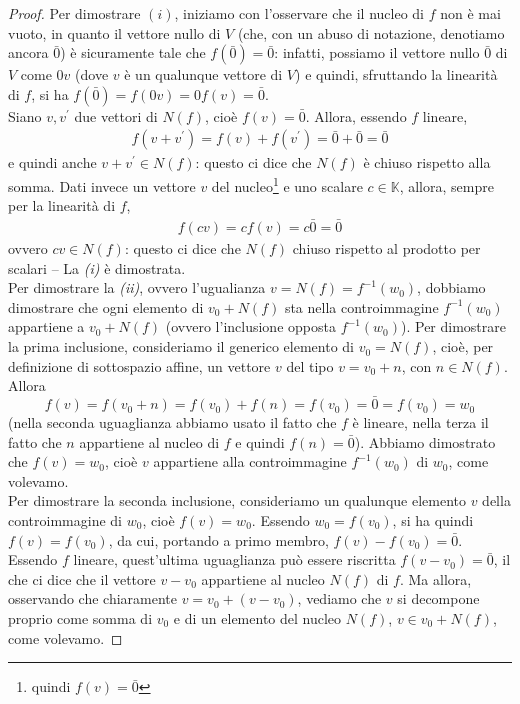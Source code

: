 \documentclass{book}
\begin{document}
\begin{proof}
  Per dimostrare $(i)$, iniziamo con l'osservare che il nucleo di $f$ non è mai vuoto, in quanto il vettore
  nullo di $V$ (che, con un abuso di notazione, denotiamo ancora $\bar{0}$) è sicuramente tale che
  $f(\bar{0})=\bar{0}$: infatti, possiamo il vettore nullo $\bar{0}$ di $V$ come $0v$ (dove $v$ è un qualunque
  vettore di $V$) e quindi, sfruttando la linearità di $f$, si ha $f(\bar{0})=f(0v)=0f(v)=\bar{0}$.\\
  Siano $v,v^\prime$ due vettori di $N(f)$, cioè $f(v)=\bar{0}$. Allora, essendo $f$ lineare,
  \begin{eqnarray*}
    f(v+v^\prime)=f(v)+f(v^\prime)=\bar{0}+\bar{0}=\bar{0}
  \end{eqnarray*}
  e quindi anche $v+v^\prime\in N(f)$: questo ci dice che $N(f)$ è chiuso rispetto alla somma.
  Dati invece un vettore $v$ del nucleo\footnote{quindi $f(v)=\bar{0}$} e uno scalare $c\in
  \mathds{K}$, allora, sempre per la linearità di $f$,
  \begin{eqnarray*}
    f(cv)=cf(v)=c\bar{0}=\bar{0}
  \end{eqnarray*}
  ovvero $cv\in N(f)$: questo ci dice che $N(f)$ chiuso rispetto al prodotto per scalari -- La
  \textit{(i)} è dimostrata.\\
  Per dimostrare la \textit{(ii)}, ovvero l'ugualianza $v=N(f)=f^{-1}(w_0)$, dobbiamo dimostrare
  che ogni elemento di $v_0+N(f)$ sta nella controimmagine $f^{-1}(w_0)$ appartiene a $v_0+N(f)$
  (ovvero l'inclusione opposta $f^{-1}(w_0)$). Per dimostrare la prima inclusione, consideriamo il
  generico elemento di $v_0=N(f)$, cioè, per definizione di sottospazio affine, un vettore $v$ del
  tipo $v=v_0+n$, con $n\in N(f)$. Allora
  \begin{equation*}
    f(v)=f(v_0+n)=f(v_0)+f(n)=f(v_0)=\bar{0}=f(v_0)=w_0
  \end{equation*}
  (nella seconda uguaglianza abbiamo usato il fatto che $f$ è lineare, nella terza il fatto che $n$ appartiene
  al nucleo di $f$ e quindi $f(n)=\bar{0}$). Abbiamo dimostrato che $f(v)=w_0$, cioè $v$ appartiene alla
  controimmagine $f^{-1}(w_0)$ di $w_0$, come volevamo.\\
  Per dimostrare la seconda inclusione, consideriamo un qualunque elemento $v$ della controimmagine di $w_0$,
  cioè $f(v)=w_0$. Essendo $w_0=f(v_0)$, si ha quindi $f(v)=f(v_0)$, da cui, portando a primo membro,
  $f(v)-f(v_0)=\bar{0}$. Essendo $f$ lineare, quest'ultima uguaglianza può essere riscritta $f(v-v_0)=\bar{0}$,
  il che ci dice che il vettore $v-v_0$ appartiene al nucleo $N(f)$ di $f$. Ma allora, osservando che chiaramente
  $v=v_0+(v-v_0)$, vediamo che $v$ si decompone proprio come somma di $v_0$ e di un elemento del nucleo $N(f)$,
  $v\in v_0+N(f)$, come volevamo.
\end{proof}
\end{document}

